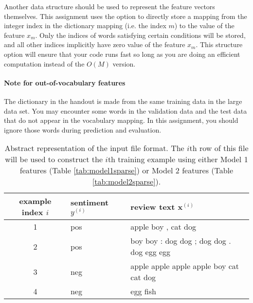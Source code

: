 \documentclass[11pt,addpoints,answers]{exam}
\newcommand{\xv}{\mathbf{x}}
\begin{document}
Another data structure should be used to represent the feature vectors themselves. This assignment uses the option to directly store a mapping from the integer index in the dictionary mapping (i.e. the index $m$) to the value of the feature $x_m$. Only the indices of words satisfying certain conditions will be stored, and all other indices implicitly have zero value of the feature $x_m$. This structure option will ensure that your code runs fast so long as you are doing an efficient computation instead of the $O(M)$ version.

\paragraph{Note for out-of-vocabulary features} The dictionary in the handout is made from the same training data in the large data set. You may encounter some words in the validation data and the test data that do not appear in the vocabulary mapping. In this assignment, you should ignore those words during prediction and evaluation.


\begin{table}[p]
    \centering
%
\begin{tabular}{cll}
\toprule
{\bf example index} $i$  & {\bf sentiment $y^{(i)}$ } & {\bf review text $\xv^{(i)}$ }\\
\midrule
1 & pos & apple boy , cat dog \\
2 & pos & boy boy : dog dog ; dog dog . dog egg egg \\
3 & neg & apple apple apple apple boy cat cat dog \\
4 & neg & egg fish \\

\bottomrule
\end{tabular}
%
    \caption{Abstract representation of the input file format.  The $i$th row of this file will be used to construct the $i$th training example using either Model 1 features (Table \ref{tab:model1sparse}) or Model 2 features (Table \ref{tab:model2sparse}).}
    \label{tab:inputfile}
\end{table}
\end{document}
